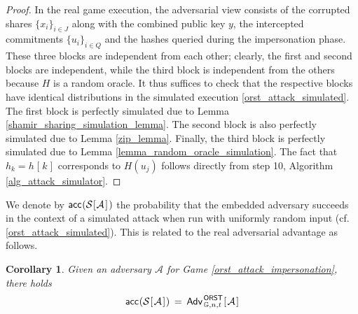 \documentclass[10pt, psamsfonts, reqno]{amsart}
\newtheorem{cor}[thm]{Corollary}
\theoremstyle{definition}
\theoremstyle{remark}
\numberwithin{equation}{section}
\begin{document}
\begin{proof}
In the real game execution, the adversarial view consists of
the corrupted shares $\{x_i\}_{i \in J}$
along with the combined public key $y$,
the intercepted commitments $\{u_i\}_{i \in Q}$
and the hashes queried during the impersonation phase.
These three blocks are independent
from each other; clearly, the first and second blocks are
independent, while the third block is independent from the others
because $H$ is a random oracle.
It thus suffices to check that the respective blocks
have identical distributions in the simulated execution
\eqref{orst_attack_simulated}.
The first block is perfectly simulated
due to Lemma \ref{shamir_sharing_simulation_lemma}.
The second block is also perfectly simulated
due to Lemma \ref{zip_lemma}.
Finally, the third block is perfectly simulated
due to Lemma \ref{lemma_random_oracle_simulation}.
The fact that
$h_k = h\hspace{1pt}[\hspace{1pt}k\hspace{1pt}]$
corresponds to $H(u_j)$
follows directly from step 10, Algorithm \ref{alg_attack_simulator}.
\vspace{5pt}
\end{proof}

\noindent
We denote by
$
\mathsf{acc}\hspace{0.5pt}(
	\mathcal{S}
	\hspace{0.5pt}
	[
		\hspace{0.5pt}
		\mathcal{A}
		\hspace{1pt}
	]
	\hspace{1pt})
$
the probability that the embedded adversary
succeeds in the context of a simulated attack
when run with uniformly random input
(cf. \eqref{orst_attack_simulated}).
This is related to the real adversarial advantage
as follows.

\begin{cor}\label{equality_intermediate}
Given an adversary $\mathcal{A}$
for Game \textup{\ref{orst_attack_impersonation}},
there holds
\vspace{5pt}
\begin{equation}
	\mathsf{acc}\hspace{0.5pt}(
		\mathcal{S}
		\hspace{0.5pt}[
			\hspace{1pt}
			\mathcal{A}
			\hspace{1pt}
		]\hspace{0.5pt}
	)
	\hspace{2pt}
	=
	\hspace{2pt}
	\mathsf{Adv}
		_{\hspace{1pt}\mathbb{G}, n, t}
		^{\hspace{1pt}\mathsf{ORST}}\hspace{0.5pt}
		[
			\hspace{1pt}
			\mathcal{A}
			\hspace{1pt}
		]
\vspace{5pt}
\end{equation}
\end{cor}
\end{document}
